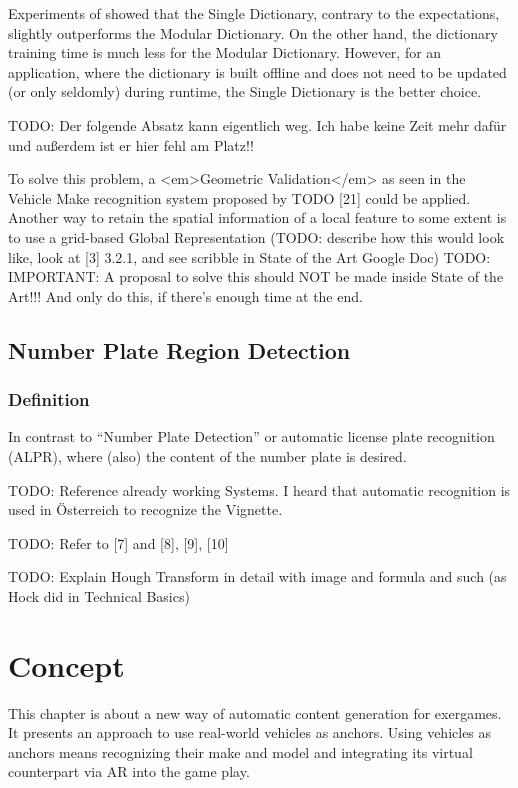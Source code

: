 Experiments of \citep{siddiqui2015robust} showed that the Single Dictionary, contrary to the expectations, slightly outperforms the Modular Dictionary. On the other hand, the dictionary training time is much less for the Modular Dictionary. However, for an application, where the dictionary is built offline and does not need to be updated (or only seldomly) during runtime, the Single Dictionary is the better choice.

TODO: Der folgende Absatz kann eigentlich weg. Ich habe keine Zeit mehr dafür und außerdem ist er hier fehl am Platz!!

To solve this problem, a <em>Geometric Validation</em> as seen in the Vehicle Make recognition system proposed by TODO [21] could be applied. Another way to retain the spatial information of a local feature to some extent is to use a grid-based Global Representation (TODO: describe how this would look like, look at [3] 3.2.1, and see scribble in State of the Art Google Doc)
TODO: IMPORTANT: A proposal to solve this should NOT be made inside State of the Art!!! And only do this, if there's enough time at the end.


\section{Number Plate Region Detection}

\subsection{Definition}
In contrast to “Number Plate Detection” or automatic license plate recognition (ALPR), where (also) the content of the number plate is desired.

TODO: Reference already working Systems. I heard that automatic recognition is used in Österreich to recognize the Vignette.

TODO: Refer to [7] and [8], [9], [10]

TODO: Explain Hough Transform in detail with image and formula and such (as Hock did in Technical Basics)







\chapter{Concept}\label{ch:concept}
This chapter is about a new way of automatic content generation for exergames. It presents an approach to use real-world vehicles as anchors. Using vehicles as anchors means recognizing their make and model and integrating its virtual counterpart via AR into the game play.

